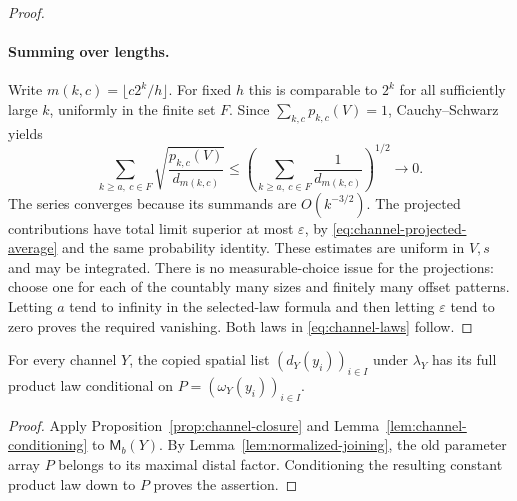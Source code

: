 \begin{proof}
\paragraph{Summing over lengths.}
Write $m(k,c)=\lfloor c2^k/h\rfloor$.  For fixed $h$ this is comparable
to $2^k$ for all sufficiently large $k$, uniformly in the finite set
$F$.  Since $\sum_{k,c}p_{k,c}(V)=1$, Cauchy--Schwarz yields
\begin{equation}\label{eq:channel-residual-sum}
 \sum_{k\ge a,\ c\in F}\sqrt{\frac{p_{k,c}(V)}{d_{m(k,c)}}}
 \le
 \left(\sum_{k\ge a,\ c\in F}\frac1{d_{m(k,c)}}\right)^{1/2}
 \longrightarrow0.
\end{equation}
The series converges because its summands are $O(k^{-3/2})$.
The projected contributions have total limit superior at most
$\varepsilon$, by \eqref{eq:channel-projected-average} and the same
probability identity.  These estimates are uniform in $V,s$ and may
be integrated.  There is no measurable-choice issue for the
projections: choose one for each of the countably many sizes and
finitely many offset patterns.  Letting $a$ tend to infinity in the
selected-law formula and then letting $\varepsilon$ tend to zero
proves the required vanishing.  Both laws in
\eqref{eq:channel-laws} follow.
\end{proof}

\begin{corollary}\label{cor:channel-copied-law}
For every channel $Y$, the copied spatial list
$(d_Y(y_i))_{i\in I}$ under $\lambda_Y$ has its full product law
conditional on $P=(\omega_Y(y_i))_{i\in I}$.
\end{corollary}

\begin{proof}
Apply Proposition~\ref{prop:channel-closure} and
Lemma~\ref{lem:channel-conditioning} to $\mathsf M_b(Y)$.
By Lemma~\ref{lem:normalized-joining}, the old parameter array $P$
belongs to its maximal distal factor.  Conditioning the resulting
constant product law down to $P$ proves the assertion.
\end{proof}
